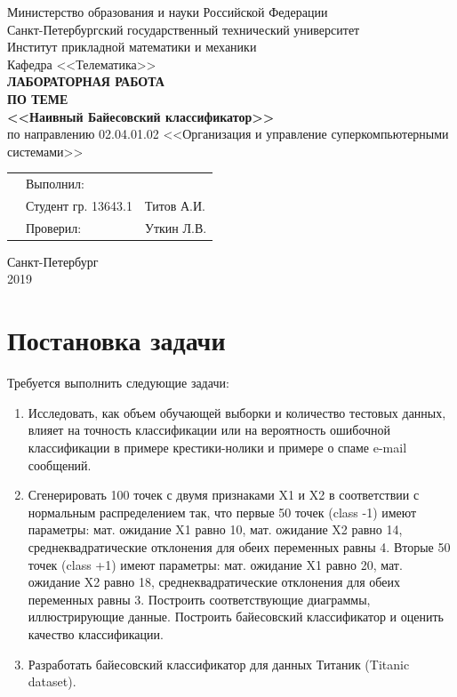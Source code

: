 \documentclass[]{article}
\numberwithin{equation}{section}
\begin{document}
    \thispagestyle{empty}
	\begin{center}
		Министерство образования и науки Российской Федерации\\
		Санкт-Петербургский государственный технический университет\\
		Институт прикладной математики и механики\\
		Кафедра <<Телематика>>\\
		\vspace{5cm}
		\textbf{\textbf{ЛАБОРАТОРНАЯ РАБОТА}}\\
        \vspace{0.5cm}
        \textbf{ПО ТЕМЕ}\\
        \vspace{0.5cm}
		\textbf{\textbf{<<Наивный Байесовский классификатор>>}}\\
		\vspace{3cm}
		по направлению 02.04.01.02 <<Организация и управление суперкомпьютерными системами>>
	\end{center}
	\vspace{2cm}
	\begin{tabular} {l l l}
	\hspace{9.5cm} & Выполнил: & \\
	& Студент гр. 13643.1 & Титов А.И.\\
	& Проверил: & Уткин Л.В.
	\end{tabular}
	\vspace{4.5cm}
	\begin{center}
		Санкт-Петербург\\
		2019
    \end{center}


	\renewcommand\contentsname{Оглавление}
	\tableofcontents

    \newpage
    \section*{Постановка задачи}

    Требуется выполнить следующие задачи:
    \begin{enumerate}
        \item Исследовать, как объем обучающей выборки и количество тестовых данных, влияет на точность классификации или на вероятность ошибочной классификации в примере крестики-нолики и примере о спаме e-mail сообщений.
        \item Сгенерировать 100 точек с двумя признаками X1 и X2 в соответствии с нормальным распределением так, что первые 50 точек (class -1) имеют параметры: мат. ожидание X1  равно 10, мат. ожидание X2 равно 14, среднеквадратические отклонения для обеих переменных равны 4. Вторые 50 точек (class +1) имеют параметры: мат. ожидание X1 равно 20, мат. ожидание X2 равно 18, среднеквадратические отклонения для обеих переменных равны 3. Построить соответствующие диаграммы, иллюстрирующие данные. Построить байесовский классификатор и оценить качество классификации.
        \item Разработать байесовский классификатор для данных Титаник (Titanic dataset).
    \end{enumerate}
\end{document}
